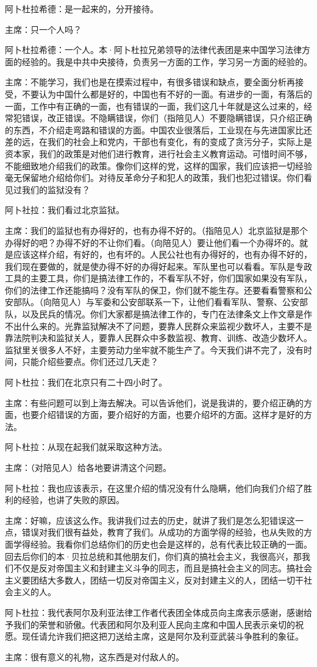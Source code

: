 阿卜杜拉希德：是一起来的，分开接待。

主席：只一个人吗？

阿卜杜拉希德：一个人。本·阿卜杜拉兄弟领导的法律代表团是来中国学习法律方面的经验的。我是中共中央接待，负责另一方面的工作，学习另一方面的经验的。

主席：不能学习，我们也是在摸索过程中，有很多错误和缺点，要全面分析再接受，不要认为中国什么都是好的，中国也有不好的一面。有进步的一面，有落后的一面，工作中有正确的一面，也有错误的一面，我们这几十年就是这么过来的，经常犯错误，改正错误。不隐瞒错误，你们（指陪见人）不要隐瞒错误，只介绍正确的东西，不介绍走弯路和错误的方面。中国农业很落后，工业现在与先进国家比还差的远，在我们的社会上和党内，干部也有变化，有的变成了贪污分子，实际上是资本家，我们的政策是对他们进行教育，进行社会主义教育运动。可惜时间不够，不能细致地介绍我们的政策。像你们这样的党，这样的国家，我们应该把一切经验毫无保留地介绍给你们。对待反革命分子和犯人的政策，我们也犯过错误。你们看见过我们的监狱没有？

阿卜社拉：我们看过北京监狱。

主席：我们的监狱也有办得好的，也有办得不好的。（指陪见人）北京监狱是那个办得好的吧？办得不好的不让你们看。（向陪见人）要让他们看一个办得坏的。就是应该这样介绍，有好的，也有坏的。人民公社也有办得好的，也有办得不好的，我们现在要做的，就是使办得不好的办得好起来。军队里也可以看看。军队是专政工具的主要工具，你们是搞法律工作的，不看军队不好，你们国家如果没有军队，你们的法律工作还能搞吗？没有军队的保卫，你们就不能生存。还要看看警察和公安部队。（向陪见人）与军委和公安部联系一下，让他们看看军队、警察、公安部队，以及民兵的情况。你们大家都是搞法律工作的，专门在法律条文上作文章是作不出什么来的。光靠监狱解决不了问题，要靠人民群众来监视少数坏人，主要不是靠法院判决和监狱关人，要靠人民群众中多数监视、教育、训练、改造少数坏人。监狱里关很多人不好，主要劳动力坐牢就不能生产了。今天我们讲不完了，没有时间，只能介绍些要点。你们还过几天走？

阿卜杜拉：我们在北京只有二十四小时了。

主席：有些问题可以到上海去解决。可以告诉他们，说是我讲的，要介绍正确的方面，也要介绍错误的方面，要介绍好的方面，也要介绍坏的方面。这样才是好的方法。

阿卜杜拉：从现在起我们就采取这种方法。

主席：（对陪见人）给各地要讲清这个问题。

阿卜杜拉：我也应该表示，在这里介绍的情况没有什么隐瞒，他们向我们介绍了胜利的经验，也讲了失败的原因。

主席：好嘛，应该这么作。我讲我们过去的历史，就讲了我们是怎么犯错误这一点，错误对我们很有益处，教育了我们。从成功的方面学得的经验，也从失败的方面学得经验。我看你们总结你们的历史也会是这样的，总有代表比较正确的一面。回去后你们的本·贝拉总统和其他朋友们，你们真的搞社会主义，我很高兴，那我们不仅是反对帝国主义和封建主义斗争的同志，而且是搞社会主义的同志。搞社会主义要团结大多数人，团结一切反对帝国主义，反对封建主义的人，团结一切干社会主义的人。

阿卜杜拉：我代表阿尔及利亚法律工作者代表团全体成员向主席表示感谢，感谢给予我们的荣誉和骄傲。代表团和阿尔及利亚人民向主席和中国人民表示亲切的祝愿。现任请允许我们把这把刀送给主席，这是阿尔及利亚武装斗争胜利的象征。

主席：很有意义的礼物，这东西是对付敌人的。


